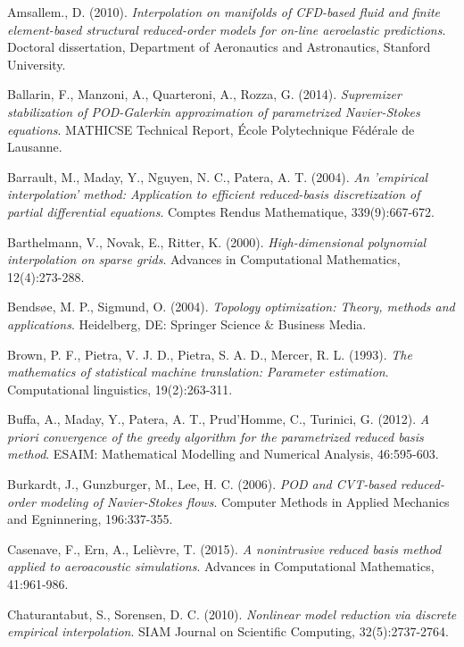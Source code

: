 \documentclass[longtitle]{elsarticle}
\numberwithin{equation}{section}
\theoremstyle{theorem}
\theoremstyle{definition}
\theoremstyle{remark}
\theoremstyle{proposition}
\numberwithin{figure}{section}
\begin{document}
	\begin{thebibliography}{50}
		
		Amsallem., D. (2010). \emph{Interpolation on manifolds of CFD-based fluid and finite element-based structural reduced-order models for on-line aeroelastic predictions}. Doctoral dissertation, Department of Aeronautics and Astronautics, Stanford University.
		
		Ballarin, F., Manzoni, A., Quarteroni, A., Rozza, G. (2014). \emph{Supremizer stabilization of POD-Galerkin approximation of parametrized Navier-Stokes equations}. MATHICSE Technical Report, \'Ecole Polytechnique F\'ed\'erale de Lausanne.
	
		Barrault, M., Maday, Y., Nguyen, N. C., Patera, A. T. (2004). \emph{An 'empirical interpolation' method: Application to efficient reduced-basis discretization of partial differential equations}. Comptes Rendus Mathematique, 339(9):667-672.
		
		Barthelmann, V., Novak, E., Ritter, K. (2000). \emph{High-dimensional polynomial interpolation on sparse grids}. Advances in Computational Mathematics, 12(4):273-288.
		
		Bends\o{}e, M. P., Sigmund, O. (2004). \emph{Topology optimization: Theory, methods and applications}. Heidelberg, DE: Springer Science \& Business Media. 
		
		Brown, P. F., Pietra, V. J. D., Pietra, S. A. D., Mercer, R. L. (1993). \emph{The mathematics of statistical machine translation: Parameter estimation}. Computational linguistics, 19(2):263-311.
		
		Buffa, A., Maday, Y., Patera, A. T., Prud'Homme, C., Turinici, G. (2012). \emph{A priori convergence of the greedy algorithm for the parametrized reduced basis method}. ESAIM: Mathematical Modelling and Numerical Analysis, 46:595-603.
		
		Burkardt, J., Gunzburger, M., Lee, H. C. (2006). \emph{POD and CVT-based reduced-order modeling of Navier-Stokes flows}. Computer Methods in Applied Mechanics and Egninnering, 196:337-355.
		
		Casenave, F., Ern, A., Lelièvre, T. (2015). \emph{A nonintrusive reduced basis method applied to aeroacoustic simulations}. Advances in Computational Mathematics, 41:961-986.
		
		Chaturantabut, S., Sorensen, D. C. (2010). \emph{Nonlinear model reduction via discrete empirical interpolation}. SIAM Journal on Scientific Computing, 32(5):2737-2764.
		

\end{thebibliography}
\end{document}
